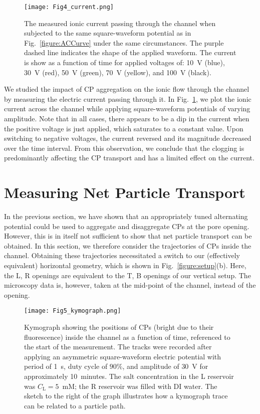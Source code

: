 \documentclass[twoside,twocolumn,9pt]{article}
\begin{document}
\begin{figure}
 \centering\texttt{[image: Fig4\_current.png]}
 \caption{\label{figure:current}The measured ionic current passing through the channel when subjected to the same square-waveform potential as in Fig.~\ref{figure:ACCurve} under the same circumstances. The purple dashed line indicates the shape of the applied waveform. The current is show as a function of time for applied voltages of: 10~V (blue), 30~V (red), 50~V (green), 70~V (yellow), and 100~V (black).}
\end{figure}

We studied the impact of CP aggregation on the ionic flow through the channel by measuring the electric current passing through it. 
In Fig.~\ref{figure:current}, we plot the ionic current across the channel while applying square-waveform potentials of varying amplitude. 
Note that in all cases, there appears to be a dip in the current when the positive voltage is just applied, which saturates to a constant value. 
Upon switching to negative voltages, the current reversed and its magnitude decreased over the time interval. 
From this observation, we conclude that the clogging is predominantly affecting the CP transport and has a limited effect on the current. 

\section*{Measuring Net Particle Transport}

In the previous section, we have shown that an appropriately tuned alternating potential could be used to aggregate and disaggregate CPs at the pore opening. However, this is in itself not sufficient to show that net particle transport can be obtained. In this section, we therefore consider the trajectories of CPs inside the channel. Obtaining these trajectories necessitated a switch to our (effectively equivalent) horizontal geometry, which is shown in Fig.~\ref{figure:setup}(b). Here, the L, R openings are equivalent to the T, B openings of our vertical setup. The microscopy data is, however, taken at the mid-point of the channel, instead of the opening.

\begin{figure}[h]
 \centering\texttt{[image: Fig5\_kymograph.png]}
 \caption{\label{figure:TrackerjammingAC}Kymograph showing the positions of CPs (bright due to their fluorescence) inside the channel as a function of time, referenced to the start of the measurement. The tracks were recorded after applying an asymmetric square-waveform electric potential with period of 1~s, duty cycle of $90\%$, and amplitude of $30$~V for approximately 10~minutes. The salt concentration in the L reservoir was $C_{\mathrm{L}} = 5$~mM; the R reservoir was filled with DI water. The sketch to the right of the graph illustrates how a kymograph trace can be related to a particle path.}
\end{figure}
\end{document}
